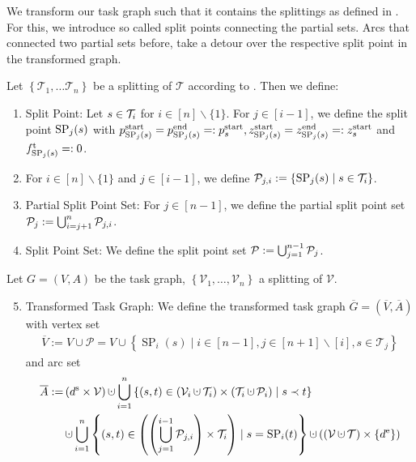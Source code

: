 We transform our task graph such that it contains the splittings as defined in . For this, we introduce so called split points connecting the partial sets. Arcs that connected two partial sets before, take a detour over the respective split point in the transformed graph.

\begin{definition}

Let $\left\{\mathcal{T}_1,\dots\mathcal{T}_n\right\}$ be a splitting of $\mathcal{T}$ according to . Then we define:
\begin{enumerate}
	\item{Split Point: Let $s\in\mathcal{T}_i$ for $i\in[n]\backslash\{1\}$. For $j\in[i-1]$, we define the split point $\operatorname{SP}_j(s)$ with $p^{\operatorname{start}}_{\operatorname{SP}_j(s)}=p^{\operatorname{end}}_{\operatorname{SP}_j(s)}=:p^{\operatorname{start}}_s, z^{\operatorname{start}}_{\operatorname{SP}_j(s)}=z^{\operatorname{end}}_{\operatorname{SP}_j(s)}=:z^{\operatorname{start}}_s$ and $f^{\operatorname{t}}_{\operatorname{SP}_j(s)}=:0$.}
	\item{For $i\in[n]\backslash\{1\}$ and $j\in[i-1]$, we define $\mathcal{P}_{j,i}:=\left\{\operatorname{SP}_j(s)\mid s\in\mathcal{T}_i\right\}$.}
	\item{Partial Split Point Set: For $j\in[n-1]$, we define the partial split point set $\mathcal{P}_j:=\bigcup_{i=j+1}^n \mathcal{P}_{j,i}$.}
	\item{Split Point Set: We define the split point set $\mathcal{P}:=\bigcup_{j=1}^{n-1}\mathcal{P}_j$.}
\end{enumerate}

Let $G=(V,A)$ be the task graph, $\left\{\mathcal{V}_1,\dots,\mathcal{V}_n\right\}$ a splitting of $\mathcal{V}$.
\begin{enumerate}
	\setcounter{enumi}{4}
	\item{Transformed Task Graph: We define the transformed task graph $\overline{G}=\left(\overline{V},\overline{A}\right)$ with vertex set
		\begin{align*}
			\overline{V} := V\cup \mathcal{P} = V\cup\left\{\operatorname{SP}_i(s)\mid i\in[n-1],j\in[n+1]\backslash[i],s\in\mathcal{T}_j\right\}
		\end{align*}
		and arc set
		\begin{align*}
			\overline{A} := & \left(\ds\times\mathcal{V}\right)\cupdot\bigcup_{i=1}^n\left\{(s,t)\in\left(\Vi\cupdot\Ti\right)\times\left(\Ti\cupdot \mathcal{P}_i\right)\mid s\prec t\right\} \\
			& \cupdot\bigcup_{i=1}^n\left\{(s,t)\in\left(\left(\bigcup_{j=1}^{i-1} \mathcal{P}_{j,i}\right)\times\Ti\right)\mid s=\operatorname{SP}_i(t)\right\}\cupdot \left(\left(\mathcal{V}\cupdot\mathcal{T}\right)\times\left\{\de\right\}\right)
		\end{align*}}
\end{enumerate}

\end{definition}

